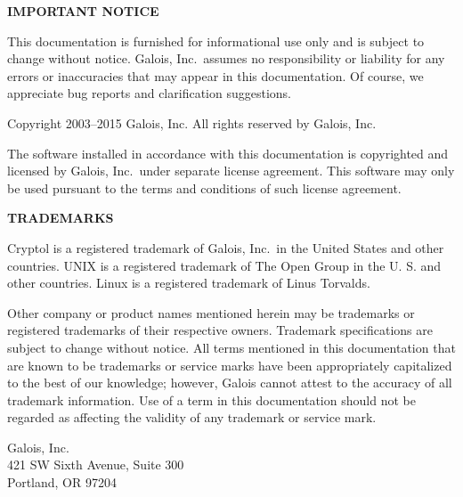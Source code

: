 \noindent
{\bf IMPORTANT NOTICE}

{\small
  This documentation is furnished for informational use only
  and is subject to change without notice. Galois, Inc.~assumes no
  responsibility or liability for any errors or inaccuracies that may
  appear in this documentation. Of course, we appreciate bug reports
  and clarification suggestions.

  Copyright 2003--2015 Galois, Inc. All rights reserved by Galois,
  Inc.

  The software installed in accordance with this documentation is
  copyrighted and licensed by Galois, Inc.~under separate license
  agreement. This software may only be used pursuant to the terms and
  conditions of such license agreement.}

\noindent
{\bf TRADEMARKS}

{\small 
  Cryptol is a registered trademark of Galois, Inc.~in the United
  States and other countries. UNIX is a registered trademark of The
  Open Group in the U. S.  and other countries. Linux is a registered
  trademark of Linus Torvalds.

  Other company or product names mentioned herein may be trademarks or
  registered trademarks of their respective owners. Trademark
  specifications are subject to change without notice. All terms
  mentioned in this documentation that are known to be trademarks or
  service marks have been appropriately capitalized to the best of our
  knowledge; however, Galois cannot attest to the accuracy of all
  trademark information. Use of a term in this documentation should
  not be regarded as affecting the validity of any trademark or
  service mark.

\vspace{0.5in}
\noindent
Galois, Inc.\\
421 SW Sixth Avenue, Suite 300 \\
Portland, OR 97204
}


